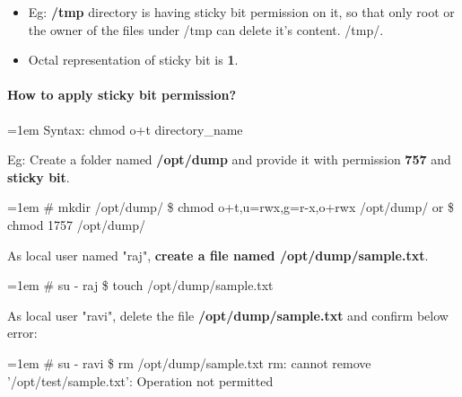 \begin{flushleft}
\begin{itemize}
		\item Eg: \textbf{/tmp} directory is having sticky bit permission on it, so that only root or the owner of the files under /tmp can delete it's content.
		/tmp/.
		\item Octal representation of sticky bit is \textbf{1}.	
	\end{itemize}
\newpage

\paragraph{How to apply sticky bit permission?}
\bigskip
\begin{tcolorbox}[breakable,notitle,boxrule=0pt,colback=pink,colframe=pink]
	\color{black}
	\font=1em
	Syntax: chmod o+t directory\_name
	\font=4pt
\end{tcolorbox}
Eg: Create a folder named \textbf{/opt/dump} and provide it with permission \textbf{757} and \textbf{sticky bit}.
\begin{tcolorbox}[breakable,notitle,boxrule=-0pt,colback=black,colframe=black]
	\color{green}
	\font=1em
	\# mkdir /opt/dump/
	\newline
	\$ chmod o+t,u=rwx,g=r-x,o+rwx /opt/dump/
	\newline
	or
	\newline
	\$ chmod 1757 /opt/dump/
	\font=4pt
\end{tcolorbox}
As local user named "raj", \textbf{create a file named /opt/dump/sample.txt}.
\begin{tcolorbox}[breakable,notitle,boxrule=-0pt,colback=black,colframe=black]
	\color{green}
	\font=1em
	\# su - raj
	\newline
	\$ touch /opt/dump/sample.txt
	\font=4pt
\end{tcolorbox}

As local user "ravi", delete the file \textbf{/opt/dump/sample.txt} and confirm below error:
\begin{tcolorbox}[breakable,notitle,boxrule=-0pt,colback=black,colframe=black]
	\color{green}
	\font=1em
	\# su - ravi
	\newline
	\$ rm /opt/dump/sample.txt
	\color{white}
	\newline
	rm: cannot remove '/opt/test/sample.txt': Operation not permitted
	\font=4pt
\end{tcolorbox}

\newpage

\end{flushleft}
